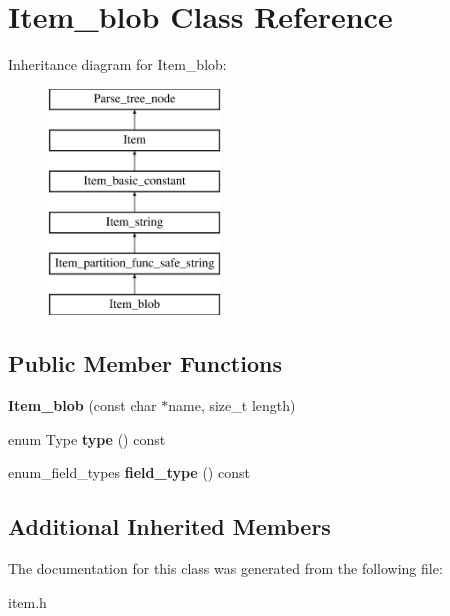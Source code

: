 \hypertarget{classItem__blob}{}\section{Item\+\_\+blob Class Reference}
\label{classItem__blob}
Inheritance diagram for Item\+\_\+blob\+:\begin{figure}[H]
\begin{center}
\leavevmode
\includegraphics[height=6.000000cm]{classItem__blob}
\end{center}
\end{figure}
\subsection*{Public Member Functions}
\begin{DoxyCompactItemize}
\item 
\mbox{\label{classItem__blob_a333bc2687efbd6d6d0bcb2f946fbf322}} 
{\bfseries Item\+\_\+blob} (const char $\ast$name, size\+\_\+t length)
\item 
\mbox{\label{classItem__blob_aa6bee96bd3fe74f9b03f88d38f7f5081}} 
enum Type {\bfseries type} () const
\item 
\mbox{\label{classItem__blob_ac1a33a4fb69adb2a2aeafa289f1062d0}} 
enum\+\_\+field\+\_\+types {\bfseries field\+\_\+type} () const
\end{DoxyCompactItemize}
\subsection*{Additional Inherited Members}


The documentation for this class was generated from the following file\+:\begin{DoxyCompactItemize}
\item 
item.\+h\end{DoxyCompactItemize}
